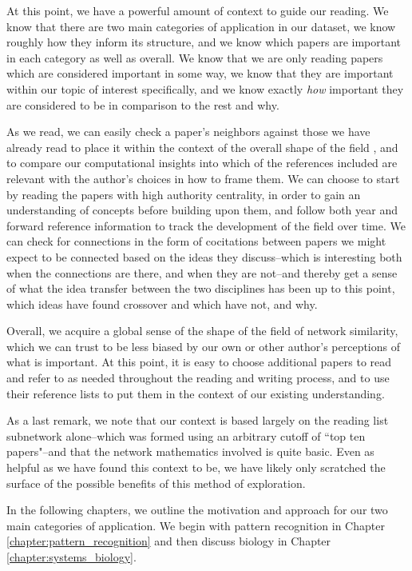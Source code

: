 \documentclass[12pt]{thesis}
\theoremstyle{plain}
\theoremstyle{definition}
\theoremstyle{remark}
\begin{document}
At this point, we have a powerful amount of context to guide our reading. We know that there are two main categories of application in our dataset, we know roughly how they inform its structure, and we know which papers are important in each category as well as overall. We know that we are only reading papers which are considered important in some way, we know that they are important within our topic of interest specifically, and we know exactly \textit{how} important they are considered to be in comparison to the rest and why. 

As we read, we can easily check a paper's neighbors against those we have already read to place it within the context of the overall shape of the field , and to compare our computational insights into which of the references included are relevant with the author's choices in how to frame them. We can choose to start by reading the papers with high authority centrality, in order to gain an understanding of concepts before building upon them, and follow both year and forward reference information to track the development of the field over time. We can check for connections in the form of cocitations between papers we might expect to be connected based on the ideas they discuss--which is interesting both when the connections are there, and when they are not--and thereby get a sense of what the idea transfer between the two disciplines has been up to this point, which ideas have found crossover and which have not, and why. 

Overall, we acquire a global sense of the shape of the field of network similarity, which we can trust to be less biased by our own or other author's perceptions of what is important. At this point, it is easy to choose additional papers to read and refer to as needed throughout the reading and writing process, and to use their reference lists to put them in the context of our existing understanding.

As a last remark, we note that our context is based largely on the reading list subnetwork alone--which was formed using an arbitrary cutoff of ``top ten papers"--and that the network mathematics involved is quite basic. Even as helpful as we have found this context to be, we have likely only scratched the surface of the possible benefits of this method of exploration.

In the following chapters, we outline the motivation and approach for our two main categories of application. We begin with pattern recognition in Chapter \ref{chapter:pattern_recognition} and then discuss biology in Chapter \ref{chapter:systems_biology}.
\end{document}
